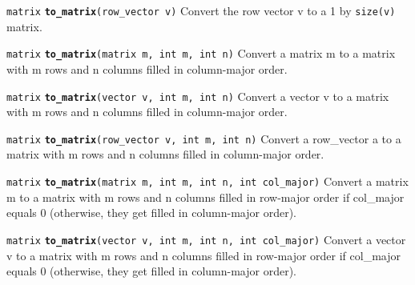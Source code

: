 \documentclass[
  10pt,
]{book}
\begin{document}

\texttt{matrix} \textbf{\texttt{to\_matrix}}\texttt{(row\_vector\ v)}\newline
Convert the row vector v to a 1 by \texttt{size(v)} matrix.


\texttt{matrix} \textbf{\texttt{to\_matrix}}\texttt{(matrix\ m,\ int\ m,\ int\ n)}\newline
Convert a matrix m to a matrix with m rows and n columns filled in
column-major order.


\texttt{matrix} \textbf{\texttt{to\_matrix}}\texttt{(vector\ v,\ int\ m,\ int\ n)}\newline
Convert a vector v to a matrix with m rows and n columns filled in
column-major order.


\texttt{matrix} \textbf{\texttt{to\_matrix}}\texttt{(row\_vector\ v,\ int\ m,\ int\ n)}\newline
Convert a row\_vector a to a matrix with m rows and n columns filled in
column-major order.


\texttt{matrix} \textbf{\texttt{to\_matrix}}\texttt{(matrix\ m,\ int\ m,\ int\ n,\ int\ col\_major)}\newline
Convert a matrix m to a matrix with m rows and n columns filled in
row-major order if col\_major equals 0 (otherwise, they get filled in
column-major order).


\texttt{matrix} \textbf{\texttt{to\_matrix}}\texttt{(vector\ v,\ int\ m,\ int\ n,\ int\ col\_major)}\newline
Convert a vector v to a matrix with m rows and n columns filled in
row-major order if col\_major equals 0 (otherwise, they get filled in
column-major order).

\end{document}
